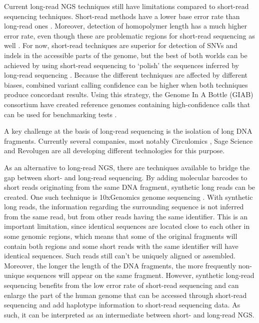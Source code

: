 Current long-read NGS techniques still have limitations compared to short-read sequencing techniques. 
Short-read methods have a lower base error rate than long-read ones \cite{Chaisson_2014,Jain_2018b,van_Dijk_2018}. 
Moreover, detection of homopolymer length has a much higher error rate, even though these are problematic regions for short-read sequencing as well \cite{Laehnemann_2015, Rang_2018}. 
For now, short-read techniques are superior for detection of SNVs and indels in the accessible parts of the genome, but the best of both worlds can be achieved by using short-read sequencing to ‘polish’ the sequences inferred by long-read sequencing \cite{Jain_2018a}. 
Because the different techniques are affected by different biases, combined variant calling confidence can be higher when both techniques produce concordant results. 
Using this strategy, the Genome In A Bottle (GIAB) consortium have created reference genomes containing high-confidence calls that can be used for benchmarking tests \cite{Zook_2014,Zook_2018}. 

A key challenge at the basis of long-read sequencing is the isolation of long DNA fragments.
Currently several companies, most notably Circulomics \cite{Liu_2018}, Sage Science \cite{Shin_2018} and Revolugen \cite{Birkenhead_2018} are all developing different technologies for this purpose.

As an alternative to long-read NGS, there are techniques available to bridge the gap between short- and long-read sequencing. 
By adding molecular barcodes to short reads originating from the same DNA fragment, synthetic long reads can be created. 
One such technique is 10xGenomics genome sequencing \cite{10xGenomics_nd}. 
With synthetic long reads, the information regarding the surrounding sequence is not inferred from the same read, but from other reads having the same identifier. 
This is an important limitation, since identical sequences are located close to each other in some genomic regions, which means that some of the original fragments will contain both regions and some short reads with the same identifier will have identical sequences. 
Such reads still can’t be uniquely aligned or assembled. 
Moreover, the longer the length of the DNA fragments, the more frequently non-unique sequences will appear on the same fragment. However, synthetic long-read sequencing benefits from the low error rate of short-read sequencing and can enlarge the part of the human genome that can be accessed through short-read sequencing and add haplotype information to short-read sequencing data. 
As such, it can be interpreted as an intermediate between short- and long-read NGS.

